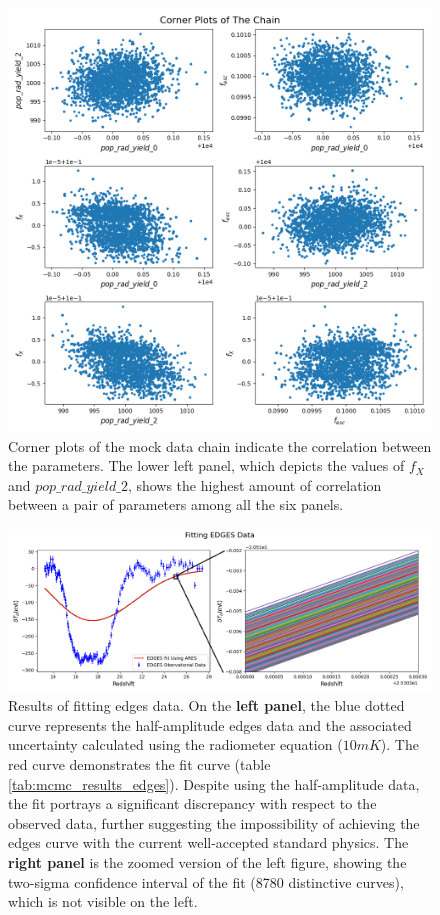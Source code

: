 \documentclass[12pt, TexShade, letterpaper]{report}
\begin{document}
\begin{figure}[h!]
\centering
\includegraphics[scale =0.6]{corner_plots_known_curve.png}
\caption[Corner plots of the mock data chain]{Corner plots of the mock data chain indicate the correlation between the parameters. The lower left panel, which depicts the values of $f_X$ and $pop\_rad\_yield\_2$, shows the highest amount of correlation between a pair of parameters among all the six panels.}
\label{fig:corner_plots_known_curve}
\end{figure}
\begin{figure}[h!]
\centering
\includegraphics[scale =0.7]{fit_curve_edges.png}
\caption[Results of fitting \gls{edges} data]{Results of fitting \gls{edges} data. On the \textbf{left panel}, the blue dotted curve represents the half-amplitude \gls{edges} data and the associated uncertainty calculated using the radiometer equation ($10mK$). The red curve demonstrates the fit curve (table \ref{tab:mcmc_results_edges}). Despite using the half-amplitude data, the fit portrays a significant discrepancy with respect to the observed data, further suggesting the impossibility of achieving the \gls{edges} curve with the current well-accepted standard physics. The \textbf{right panel} is the zoomed version of the left figure, showing the two-sigma confidence interval of the fit (8780 distinctive curves), which is not visible on the left.}
\label{fig:fit_curve_edges}
\end{figure}
\end{document}
